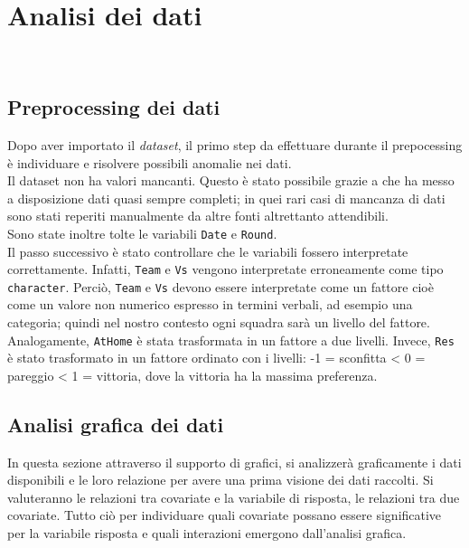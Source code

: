 
\chapter{Analisi dei dati}
\label{cap:Analisi}
\\


\section{Preprocessing dei dati}
Dopo aver importato il \emph{dataset}, il primo step da effettuare durante il prepocessing è individuare e risolvere possibili anomalie nei dati.\\
Il dataset non ha valori mancanti. Questo è stato possibile grazie a \texttt{\cite{fbref}} che ha messo a disposizione dati quasi sempre completi; in quei rari casi di mancanza di dati sono stati reperiti manualmente da altre fonti altrettanto attendibili.\\ 
Sono state inoltre tolte le variabili \texttt{Date} e \texttt{Round}.\\
Il passo successivo è stato controllare che le variabili fossero interpretate correttamente. Infatti, \texttt{Team} e \texttt{Vs} vengono interpretate erroneamente come tipo \texttt{character}. Perciò, \texttt{Team} e \texttt{Vs} devono essere interpretate come un fattore cioè come un valore non numerico espresso in termini verbali, ad esempio una categoria; quindi nel nostro contesto ogni squadra sarà un livello del fattore. Analogamente, \texttt{AtHome} è stata trasformata in un fattore a due livelli. Invece, \texttt{Res} è stato trasformato in un fattore ordinato con i livelli: -1 = sconfitta <  0 = pareggio < 1 = vittoria, dove la vittoria ha la massima preferenza.


\section{Analisi grafica dei dati}
In questa sezione attraverso il supporto di grafici, si analizzerà graficamente i dati disponibili e le loro relazione per avere una prima visione dei dati raccolti. Si valuteranno le relazioni tra covariate e la variabile di risposta, le relazioni tra due covariate. Tutto ciò per individuare quali covariate possano essere significative per la variabile risposta e quali interazioni emergono dall'analisi grafica.\\

